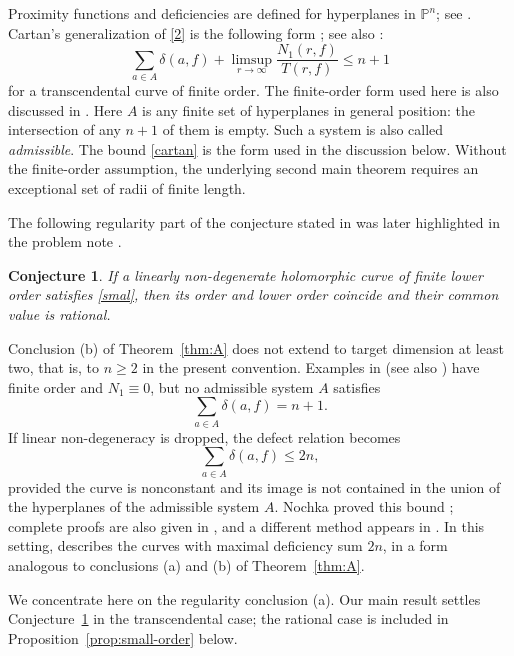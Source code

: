 \documentclass[12pt,letterpaper,reqno]{amsart}
\newtheorem{conj}[thm]{Conjecture}
\theoremstyle{definition}
\numberwithin{equation}{section}
\newcommand{\PP}{\mathbb P}
\begin{document}
Proximity functions and deficiencies are defined for hyperplanes in
$\PP^{n}$; see \cite{Car33,Ru21}. Cartan's generalization of \eqref{2} is
the following form \cite[Theorem~7.1 and Corollary~7.4, pp.~445--446]{GH04};
see also \cite{Car33,Ru21}:
\begin{equation}\label{cartan}
 \sum_{a\in A}\delta(a,f)
 +\limsup_{r\to\infty}\frac{N_1(r,f)}{T(r,f)}\leq n+1
\end{equation}
for a transcendental curve of finite order. The finite-order form used here is
also discussed in \cite{GH04,Ru21}. Here $A$ is any finite set of
hyperplanes in general position: the intersection of any \(n+1\) of them is
empty. Such a system is also called \emph{admissible}. The bound
\eqref{cartan} is the form used in the discussion below. Without the
finite-order assumption, the underlying second main theorem requires
an exceptional set of radii of finite length.

The following regularity part of the conjecture stated in \cite[pp.~4--5]{Ere98}
was later highlighted in the problem note \cite{Ere15b}.

\begin{conj}\label{conj:regularity}
If a linearly non-degenerate holomorphic curve of finite lower order
satisfies \eqref{smal}, then its order and lower order coincide and their
common value is rational.
\end{conj}

Conclusion (b) of Theorem~\ref{thm:A} does not extend to target dimension at least
two, that is, to \(n\geq2\) in the present convention. Examples in \cite{Ere98}
(see also \cite{Ere14,Ere15a}) have finite order and $N_1\equiv0$, but no
admissible system $A$ satisfies
\[
 \sum_{a\in A}\delta(a,f)=n+1.
\]
If linear non-degeneracy is dropped, the defect relation becomes
\[
 \sum_{a\in A}\delta(a,f)\leq2n,
\]
provided the curve is nonconstant and its image is not contained in the
union of the hyperplanes of the admissible system $A$.
Nochka proved this bound \cite{Noc83}; complete proofs are also given in
\cite{Voj97,Ru21}, and a different method appears in \cite{ES92}.
In this setting, \cite{Ere98} describes the curves with maximal
deficiency sum $2n$, in a form analogous to conclusions (a) and (b)
of Theorem~\ref{thm:A}.

We concentrate here on the regularity conclusion (a). Our main result
settles Conjecture~\ref{conj:regularity} in the transcendental case; the
rational case is included in Proposition~\ref{prop:small-order} below.
\end{document}
